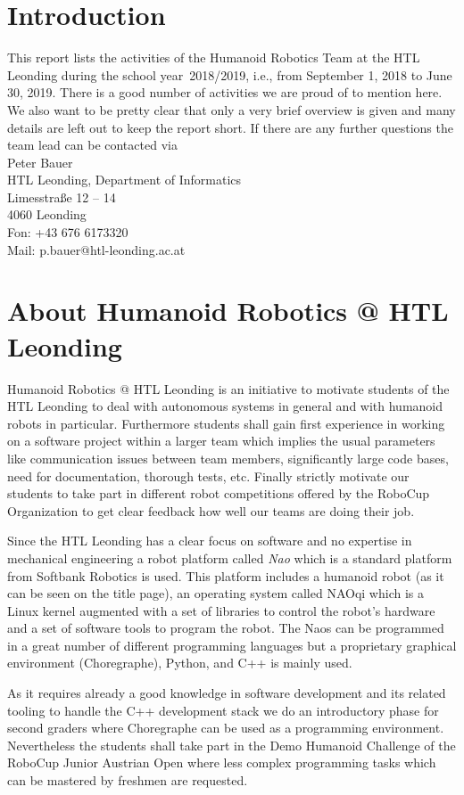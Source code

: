 \documentclass[11pt]{article}
\begin{document}
\section{Introduction}
This report lists the activities of the Humanoid Robotics Team at the HTL Leonding during the school year~2018/2019, i.e., from September 1, 2018 to June 30, 2019. There is a good number of activities we are proud of to mention here. We also want to be pretty clear that only  a very brief overview is given and many details are left out to keep the report short. If there are any further questions the team lead can be contacted via \\[1em]
Peter Bauer\\
HTL Leonding, Department of Informatics\\
Limesstraße 12 -- 14\\
4060 Leonding\\
Fon: +43 676 6173320\\
Mail: p.bauer@htl-leonding.ac.at

\section{About Humanoid Robotics @ HTL Leonding}
Humanoid Robotics @ HTL Leonding is an initiative to motivate students of the HTL Leonding to deal with autonomous systems in general and with humanoid robots in particular. Furthermore students shall gain first experience in working on a software project within a larger team which implies the usual parameters like communication issues between team members, significantly large code bases, need for documentation, thorough tests, etc. Finally strictly motivate our students to take part in different robot competitions offered by the RoboCup Organization to get clear feedback how well our teams are doing their job.

Since the HTL Leonding has a clear focus on software and no expertise in mechanical engineering a robot platform called {\em Nao} which is a standard platform from Softbank Robotics is used. This platform includes a humanoid robot (as it can be seen on the title page), an operating system called NAOqi which is a Linux kernel augmented with a set of libraries to control the robot's hardware and a set of software tools to program the robot. The Naos can be programmed in a great number of different programming languages but a proprietary graphical environment (Choregraphe), Python, and  C++ is mainly used.

As it requires already a good knowledge in software development and its related tooling to handle the C++ development stack we do an introductory phase for second graders where Choregraphe can be used as a programming environment. Nevertheless the students shall take part in the Demo Humanoid Challenge of the RoboCup Junior Austrian Open where less complex programming tasks which can be mastered by freshmen are requested.
\end{document}
